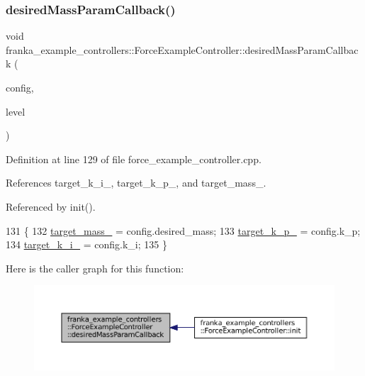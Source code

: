 \subsubsection{\texorpdfstring{desired\+Mass\+Param\+Callback()}{desiredMassParamCallback()}}
{\footnotesize\ttfamily void franka\+\_\+example\+\_\+controllers\+::\+Force\+Example\+Controller\+::desired\+Mass\+Param\+Callback (\begin{DoxyParamCaption}\item[{franka\+\_\+example\+\_\+controllers\+::desired\+\_\+mass\+\_\+param\+Config \&}]{config,  }\item[{uint32\+\_\+t}]{level }\end{DoxyParamCaption})\hspace{0.3cm}{\ttfamily [private]}}



Definition at line 129 of file force\+\_\+example\+\_\+controller.\+cpp.



References target\+\_\+k\+\_\+i\+\_\+, target\+\_\+k\+\_\+p\+\_\+, and target\+\_\+mass\+\_\+.



Referenced by init().


\begin{DoxyCode}
131                 \{
132   \hyperlink{classfranka__example__controllers_1_1ForceExampleController_a351793b041d57afb712be67410821cdc}{target\_mass\_} = config.desired\_mass;
133   \hyperlink{classfranka__example__controllers_1_1ForceExampleController_ae5b17c481b7c7acebb8f378e29bf6b77}{target\_k\_p\_} = config.k\_p;
134   \hyperlink{classfranka__example__controllers_1_1ForceExampleController_ae4636481a611830a438a2b49ccb05f17}{target\_k\_i\_} = config.k\_i;
135 \}
\end{DoxyCode}
Here is the caller graph for this function\+:
\nopagebreak
\begin{figure}[H]
\begin{center}
\leavevmode
\includegraphics[width=350pt]{classfranka__example__controllers_1_1ForceExampleController_ac7db01746d2398acab73424e6a98f501_icgraph}
\end{center}
\end{figure}
\mbox{\label{classfranka__example__controllers_1_1ForceExampleController_adb9839ab5bf49901849839bb5ce73932}} 
